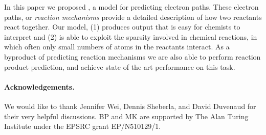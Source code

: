 
In this paper we proposed \ourModel, a model for predicting electron paths.
These electron paths, or {\em reaction mechanisms} provide a detailed description of how two reactants react together. 
Our model, (1) produces output that is easy for chemists to interpret and (2) is able to exploit the sparsity involved in chemical reactions, in which often only small numbers of atoms in the reactants interact.
As a byproduct of predicting reaction mechanisms we are also able to perform reaction product prediction,
 and achieve state of the art performance on this task.

 \paragraph{Acknowledgements.}
We would like to thank Jennifer Wei, Dennis Sheberla, and David Duvenaud for their very helpful discussions.
BP and MK are supported by The Alan Turing Institute under the EPSRC grant EP/N510129/1.
